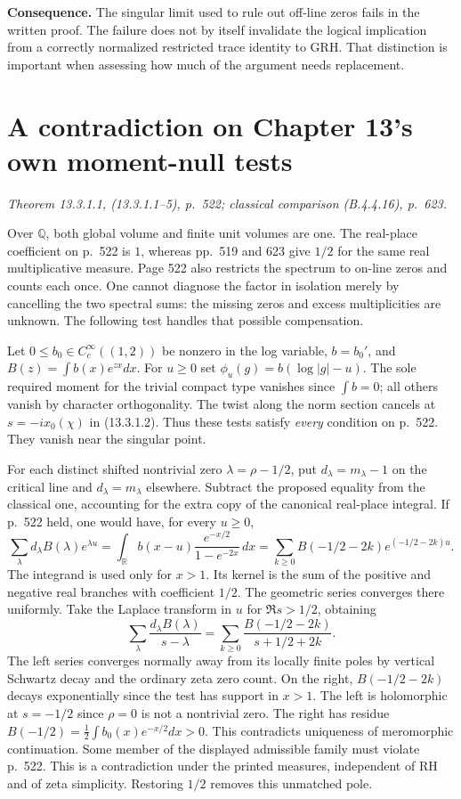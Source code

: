 \documentclass[11pt,reqno]{amsart}
\numberwithin{equation}{section}
\newcommand{\Q}{\mathbb Q}\newcommand{\R}{\mathbb R}\newcommand{\C}{\mathbb C}\newcommand{\Z}{\mathbb Z}
\begin{document}
\textbf{Consequence.} The singular limit used to rule out off-line zeros fails in the written proof. The failure does not by itself invalidate the logical implication from a correctly normalized restricted trace identity to GRH. That distinction is important when assessing how much of the argument needs replacement.


\section{A contradiction on Chapter 13's own moment-null tests}\label{sec:11}

\textit{Theorem 13.3.1.1, (13.3.1.1--5), p.~522; classical comparison (B.4.4.16), p.~623.}\par
Over \(\Q\), both global volume and finite unit volumes are one. The real-place coefficient on p.~522 is \(1\), whereas pp.~519 and 623 give \(1/2\) for the same real multiplicative measure. Page 522 also restricts the spectrum to on-line zeros and counts each once. One cannot diagnose the factor in isolation merely by cancelling the two spectral sums: the missing zeros and excess multiplicities are unknown. The following test handles that possible compensation.

Let \(0\le b_0\in C_c^\infty((1,2))\) be nonzero in the log variable, \(b=b_0'\), and \(B(z)=\int b(x)e^{zx}dx\). For \(u\ge0\) set \(\phi_u(g)=b(\log|g|-u)\). The sole required moment for the trivial compact type vanishes since \(\int b=0\); all others vanish by character orthogonality. The twist along the norm section cancels at \(s=-ix_0(\chi)\) in (13.3.1.2). Thus these tests satisfy \emph{every} condition on p.~522. They vanish near the singular point.

For each distinct shifted nontrivial zero \(\lambda=\rho-1/2\), put \(d_\lambda=m_\lambda-1\) on the critical line and \(d_\lambda=m_\lambda\) elsewhere. Subtract the proposed equality from the classical one, accounting for the extra copy of the canonical real-place integral. If p.~522 held, one would have, for every \(u\ge0\),
\[
 \sum_\lambda d_\lambda B(\lambda)e^{\lambda u}
   = \int_\R b(x-u)\frac{e^{-x/2}}{1-e^{-2x}}\,dx
   =\sum_{k\ge0} B(-1/2-2k)e^{(-1/2-2k)u}.
\]
The integrand is used only for \(x>1\). Its kernel is the sum of the positive and negative real branches with coefficient \(1/2\). The geometric series converges there uniformly. Take the Laplace transform in \(u\) for \(\Re s>1/2\), obtaining
\[
  \sum_\lambda\frac{d_\lambda B(\lambda)}{s-\lambda}
    =\sum_{k\ge0}\frac{B(-1/2-2k)}{s+1/2+2k}.
\]
The left series converges normally away from its locally finite poles by vertical Schwartz decay and the ordinary zeta zero count. On the right, \(B(-1/2-2k)\) decays exponentially since the test has support in \(x>1\). The left is holomorphic at \(s=-1/2\) since \(\rho=0\) is not a nontrivial zero. The right has residue \(B(-1/2)=\frac12\int b_0(x)e^{-x/2}dx>0\). This contradicts uniqueness of meromorphic continuation. Some member of the displayed admissible family must violate p.~522. This is a contradiction under the printed measures, independent of RH and of zeta simplicity. Restoring \(1/2\) removes this unmatched pole.
\end{document}
